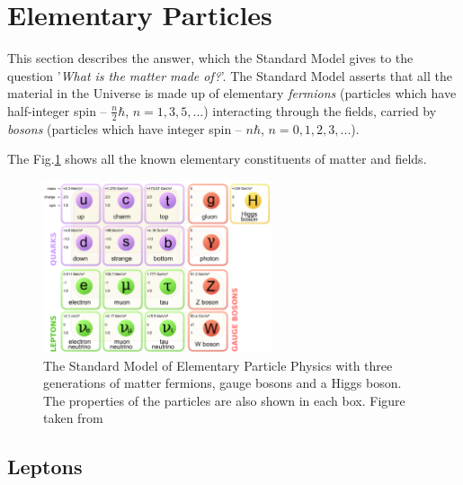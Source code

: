 \section{Elementary Particles}

This section describes the answer, which the Standard Model gives to the question '\textit{What is the matter made of?}'.
The Standard Model asserts that all the material in the Universe is made up of elementary \textit{fermions} (particles
which have half-integer spin -- $\frac{n}{2}\hbar$, $n = 1, 3, 5, ...$) interacting through the fields, carried 
by \textit{bosons} (particles which have integer spin -- $n\hbar$, $n = 0, 1, 2, 3, ...$). 

The Fig.\ref{fig:SM_Particles} shows all the known elementary constituents of matter and fields.
\begin{figure}[t]
  \centering
  \includegraphics[width=0.6\textwidth]{01_Theory_SM/plots/Standard_Model_of_Elementary_Particles.png}
  \caption{The Standard Model of Elementary Particle Physics with three generations of matter fermions, gauge bosons and a Higgs boson. 
  The properties of the particles are also shown in each box. Figure taken from \cite{WikiSM}}
  \label{fig:SM_Particles}
\end{figure}


\subsection{Leptons}


